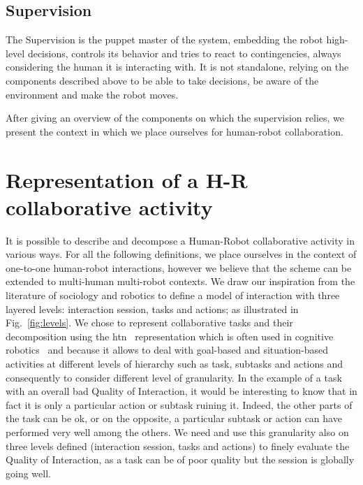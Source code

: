\documentclass[a4paper,11pt,twoside]{StyleThese}
\begin{document}
\subsection{Supervision}
The Supervision is the puppet master of the system, embedding the robot high-level decisions, controls its behavior and tries to react to contingencies, always considering the human it is interacting with. It is not standalone, relying on the components described above to be able to take decisions, be aware of the environment and make the robot moves.
\newline

After giving an overview of the components on which the supervision relies, we present the context in which we place ourselves for human-robot collaboration.

\section{Representation of a H-R collaborative activity}\label{chap2:sec:levels}
It is possible to describe and decompose a Human-Robot collaborative activity in various ways. For all the following definitions, we place ourselves in the context of one-to-one human-robot interactions, however we  believe that the scheme can be extended to multi-human multi-robot contexts. 
We draw our inspiration from the literature of sociology and robotics to define a model of interaction with three layered levels: interaction session, tasks and actions; as illustrated in Fig.~\ref{fig:levels}. We chose to represent collaborative tasks and their decomposition using the \acrfull{htn}~\cite{ghallab_2016_automated} representation which is often used in cognitive robotics~\cite{ingrand-2017,lallement_2014_hatp, buisan_2021_human} and because it allows to deal with goal-based and situation-based activities at different levels of hierarchy such as task, subtasks and actions and consequently to consider different level of granularity. In the example of a task with an overall bad Quality of Interaction, it would be interesting to know that in fact it is only a particular action or subtask ruining it. Indeed, the other parts of the task can be ok, or on the opposite, a particular subtask or action can have performed very well among the others. We need and use this granularity also on three levels defined (interaction session, tasks and actions) to finely evaluate the Quality of Interaction, as a task can be of poor quality but the session is globally going well. 
\end{document}
